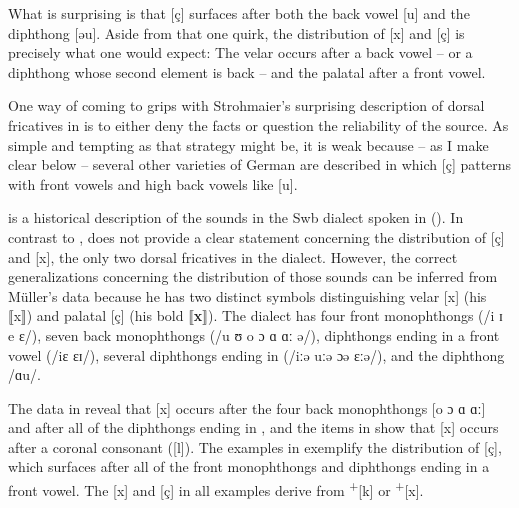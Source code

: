 What is surprising is that [ç] surfaces after both the back vowel [u] and the diphthong [əu]. Aside from that one quirk, the distribution of [x] and [ç] is precisely what one would expect: The velar occurs after a back vowel -- or a diphthong whose second element is back -- and the palatal after a front vowel.

One way of coming to grips with Strohmaier’s surprising description of dorsal fricatives in  is to either deny the facts or question the reliability of the source. As simple and tempting as that strategy might be, it is weak because -- as I make clear below -- several other varieties of German are described in which [ç] patterns with front vowels and high back vowels like [u].

\citet{Müller1911} is a historical description of the sounds in the Swb dialect spoken in  (). In contrast to \citet{Strohmaier1930}, \citet{Müller1911} does not provide a clear statement concerning the distribution of [ç] and [x], the only two dorsal fricatives in the dialect. However, the correct generalizations concerning the distribution of those sounds can be inferred from Müller’s data because he has two distinct symbols distinguishing velar [x] (his ⟦x⟧) and palatal [ç] (his bold ⟦\textbf{x}⟧). The dialect has four front monophthongs (/i ɪ e ɛ/), seven back monophthongs (/u ʊ o ɔ ɑ ɑː ə/), diphthongs ending in a front vowel (/iɛ ɛɪ/), several diphthongs ending in  (/iːə uːə ɔə ɛːə/), and the diphthong /ɑu/.

The data in  reveal that [x] occurs after the four back monophthongs [o ɔ ɑ ɑː] and after all of the diphthongs ending in , and the items in  show that [x] occurs after a coronal consonant ([l]). The examples in  exemplify the distribution of [ç], which surfaces after all of the front monophthongs and diphthongs ending in a front vowel. The [x] and [ç] in all examples derive from  \textsuperscript{+}[k] or \textsuperscript{+}[x].

